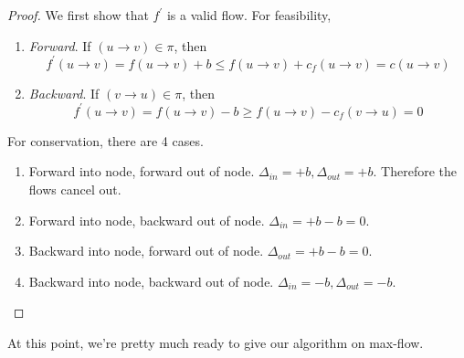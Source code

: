   \begin{proof}
    We first show that $f^\prime$ is a valid flow. For feasibility, 
    \begin{enumerate}
      \item \textit{Forward}. If $(u \rightarrow  v) \in \pi$, then 
        \begin{equation}
          f^\prime (u \rightarrow v) = f(u \rightarrow v) + b \leq f(u \rightarrow v) + c_f (u \rightarrow v) = c(u \rightarrow v)
        \end{equation} 
      \item \textit{Backward}. If $(v \rightarrow u) \in \pi$, then 
        \begin{equation}
        f^\prime (u \rightarrow v) = f(u \rightarrow v) - b \geq f(u \rightarrow v) - c_f (v \rightarrow u) = 0 
        \end{equation}
    \end{enumerate}

    For conservation, there are 4 cases. 
    \begin{enumerate}
      \item Forward into node, forward out of node. $\Delta_{in} = +b, \Delta_{out} = +b$. Therefore the flows cancel out. 
      \item Forward into node, backward out of node. $\Delta_{in} = +b - b = 0$. 
      \item Backward into node, forward out of node. $\Delta_{out} = +b - b = 0$. 
      \item Backward into node, backward out of node. $\Delta_{in} = -b, \Delta_{out} = - b$. 
    \end{enumerate}
  \end{proof} 

  At this point, we're pretty much ready to give our algorithm on max-flow. 

